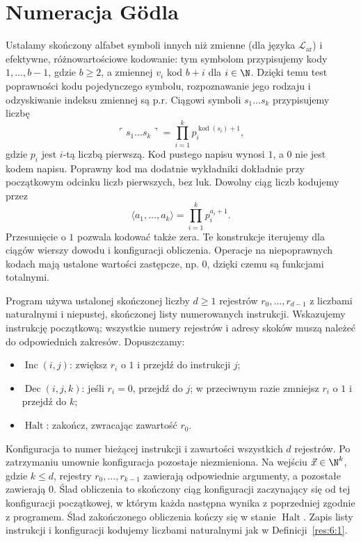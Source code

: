 \section{Numeracja Gödla}\label{sec:numeracja-godla}
\begin{definicja}\label{res:6:1}
Ustalamy skończony alfabet symboli innych niż zmienne (dla języka $\mathcal L_{\mathrm{ar}}$) i efektywne, różnowartościowe kodowanie: tym symbolom przypisujemy kody $1,\ldots,b-1$, gdzie $b\ge2$, a zmiennej $v_i$ kod $b+i$ dla $i\in\N$. Dzięki temu test poprawności kodu pojedynczego symbolu, rozpoznawanie jego rodzaju i odzyskiwanie indeksu zmiennej są p.r. Ciągowi symboli $s_1\ldots s_k$ przypisujemy liczbę
\[
\ulcorner s_1\ldots s_k\urcorner=\prod_{i=1}^k p_i^{\operatorname{kod}(s_i)+1},
\]
gdzie $p_i$ jest $i$-tą liczbą pierwszą. Kod pustego napisu wynosi $1$, a $0$ nie jest kodem napisu. Poprawny kod ma dodatnie wykładniki dokładnie przy początkowym odcinku liczb pierwszych, bez luk. Dowolny ciąg liczb kodujemy przez
\[
\langle a_1,\ldots,a_k\rangle=\prod_{i=1}^k p_i^{a_i+1}.
\]
Przesunięcie o $1$ pozwala kodować także zera. Te konstrukcje iterujemy dla ciągów wierszy dowodu i konfiguracji obliczenia. Operacje na niepoprawnych kodach mają ustalone wartości zastępcze, np. $0$, dzięki czemu są funkcjami totalnymi.
\end{definicja}

\begin{definicja}\label{res:6:2}
Program używa ustalonej skończonej liczby $d\ge1$ rejestrów $r_0,\ldots,r_{d-1}$ z liczbami naturalnymi i niepustej, skończonej listy numerowanych instrukcji. Wskazujemy instrukcję początkową; wszystkie numery rejestrów i adresy skoków muszą należeć do odpowiednich zakresów. Dopuszczamy:
\begin{itemize}
\item $\operatorname{Inc}(i,j)$: zwiększ $r_i$ o $1$ i przejdź do instrukcji $j$;
\item $\operatorname{Dec}(i,j,k)$: jeśli $r_i=0$, przejdź do $j$; w przeciwnym razie zmniejsz $r_i$ o $1$ i przejdź do $k$;
\item $\operatorname{Halt}$: zakończ, zwracając zawartość $r_0$.
\end{itemize}
Konfiguracja to numer bieżącej instrukcji i zawartości wszystkich $d$ rejestrów. Po zatrzymaniu umownie konfiguracja pozostaje niezmieniona. Na wejściu $\vec x\in\N^k$, gdzie $k\le d$, rejestry $r_0,\ldots,r_{k-1}$ zawierają odpowiednie argumenty, a pozostałe zawierają $0$. Ślad obliczenia to skończony ciąg konfiguracji zaczynający się od tej konfiguracji początkowej, w którym każda następna wynika z poprzedniej zgodnie z programem. Ślad zakończonego obliczenia kończy się w stanie $\operatorname{Halt}$. Zapis listy instrukcji i konfiguracji kodujemy liczbami naturalnymi jak w Definicji~\ref{res:6:1}.
\end{definicja}

